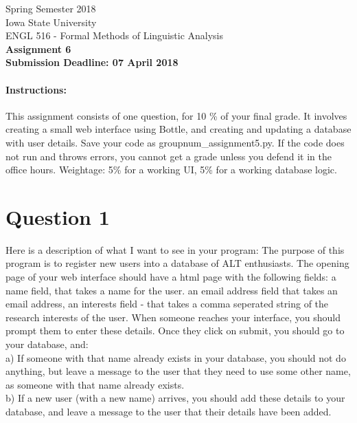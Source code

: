 \documentclass[11pt,a4paper]{article}
\begin{document}
\begin{center}
  Spring Semester 2018 \\ Iowa State University\\[3ex]
  {\large ENGL 516 - Formal Methods of Linguistic Analysis}\\[3ex]
  \textbf{Assignment 6} \\ \textbf{Submission Deadline: 07 April 2018}
\end{center}


\paragraph{Instructions:} This assignment consists of one question, for 10 \% of your final grade. It involves creating a small web interface using Bottle, and creating and updating a database with user details. Save your code as groupnum\_assignment5.py. If the code does not run and throws errors, you cannot get a grade unless you defend it in the office hours. Weightage: 5\% for a working UI, 5\% for a working database logic.

\section*{Question 1}
Here is a description of what I want to see in your program: The purpose of this program is to register new users into a database of ALT enthusiasts. The opening page of your web interface should have a html page with the following fields:
a name field, that takes a name for the user. an email address field that takes an email address, an interests field - that takes a comma seperated string of the research interests of the user. When someone reaches your interface, you should prompt them to enter these details. Once they click on submit, you should go to your database, and: \\
a) If someone with that name already exists in your database, you should not do anything, but leave a message to the user that they need to use some other name, as someone with that name already exists. \\
b) If a new user (with a new name) arrives, you should add these details to your database, and leave a message to the user that their details have been added. 
\end{document}
